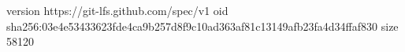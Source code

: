 version https://git-lfs.github.com/spec/v1
oid sha256:03e4e53433623fde4ca9b257d8f9c10ad363af81c13149afb23fa4d34ffaf830
size 58120
